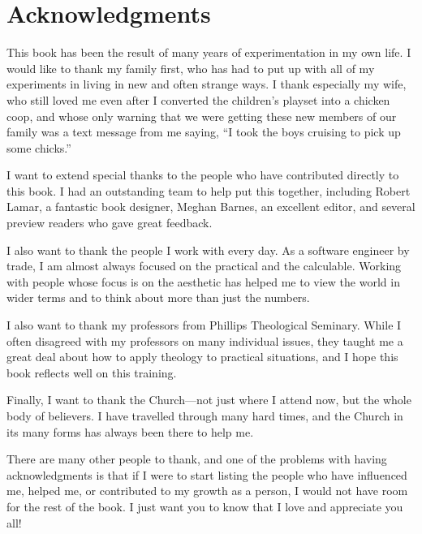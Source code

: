 \chapter*{Acknowledgments}

This book has been the result of many years of experimentation in my own life.
I would like to thank my family first, who has had to put up with all of my 
experiments in living in new and often strange ways.  I thank especially my
wife, who still loved me even after I converted the children's playset into 
a chicken coop, and whose only warning that we were getting these new members
of our family was a text message from me saying,
``I took the boys cruising to pick up some chicks.''  

I want to extend special thanks to the people who have contributed directly
to this book.  I had an outstanding team to help put this together, including
Robert Lamar, a fantastic book designer, Meghan Barnes, an excellent editor,
and several preview readers who gave great feedback.

I also want to thank the people I work with every day.  As a software engineer
by trade, I am almost always focused on the practical and the calculable.
Working with people whose focus is on the aesthetic has helped me to 
view the world in wider terms and to think about more than just the numbers.

I also want to thank my professors from Phillips Theological Seminary.
While I often disagreed with my professors on many individual issues,
they taught me a great deal about how to apply theology to
practical situations, and I hope this book reflects well on this training.  

Finally, I want to thank the Church---not just where I attend now, but the 
whole body of believers.  I have travelled through many hard times, and the
Church in its many forms has always been there to help me.

There are many other people to thank, and one of the problems with having acknowledgments
is that if I were to start listing the people who have influenced me, helped me,
or contributed to my growth as a person, I would not have room for the rest
of the book.  I just want you to know that I love and appreciate you all!
